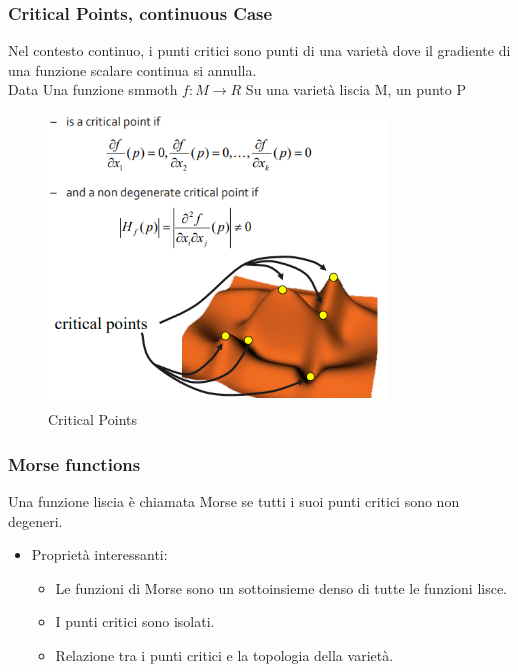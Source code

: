 \subsubsection{Critical Points, continuous Case}
Nel contesto continuo, i punti critici sono punti di una varietà dove il gradiente di una funzione scalare continua si annulla.\\
Data Una funzione smmoth $f:M \rightarrow R $ Su una varietà liscia M, un punto P
\begin{figure}[H]
    \centering
    \includegraphics[width=0.8\textwidth]{images/CriticalPoints.png} 
    \caption{Critical Points}
    \label{fig:immagine}
\end{figure}
\subsubsection{Morse functions}
Una funzione liscia è chiamata Morse se tutti i suoi punti critici sono non degeneri.
\begin{itemize}
    \item Proprietà interessanti:
    \begin{itemize}
        \item Le funzioni di Morse sono un sottoinsieme denso di tutte le funzioni lisce.
        \item I punti critici sono isolati.
        \item Relazione tra i punti critici e la topologia della varietà.
    \end{itemize}
\end{itemize}
